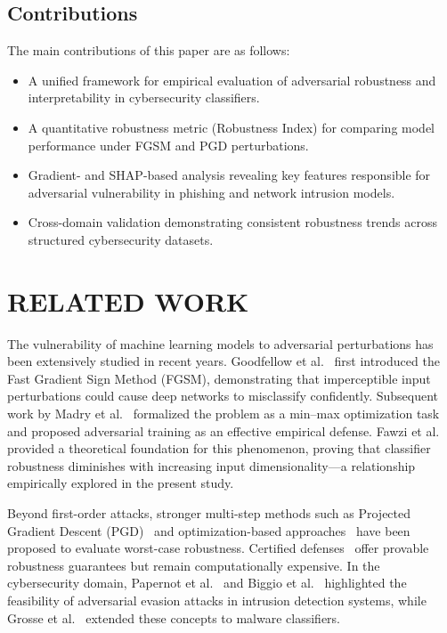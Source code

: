\documentclass[a4paper,twoside]{article}
\begin{document}
\subsection{Contributions}
The main contributions of this paper are as follows:
\begin{itemize}
    \item A unified framework for empirical evaluation of adversarial robustness 
          and interpretability in cybersecurity classifiers.
    \item A quantitative robustness metric (Robustness Index) 
          for comparing model performance under FGSM and PGD perturbations.
    \item Gradient- and SHAP-based analysis revealing key features 
          responsible for adversarial vulnerability in phishing and network intrusion models.
    \item Cross-domain validation demonstrating consistent robustness trends 
          across structured cybersecurity datasets.
\end{itemize}

\section{\uppercase{Related Work}}

The vulnerability of machine learning models to adversarial perturbations 
has been extensively studied in recent years. 
Goodfellow et al.~\cite{goodfellow2015explaining} first introduced 
the Fast Gradient Sign Method (FGSM), demonstrating that imperceptible 
input perturbations could cause deep networks to misclassify confidently. 
Subsequent work by Madry et al.~\cite{madry2018towards} formalized the problem 
as a min--max optimization task and proposed adversarial training 
as an effective empirical defense. 
Fawzi et al.~\cite{fawzi2018analysis} provided a theoretical foundation 
for this phenomenon, proving that classifier robustness diminishes 
with increasing input dimensionality---a relationship empirically explored 
in the present study.

Beyond first-order attacks, stronger multi-step methods such as 
Projected Gradient Descent (PGD)~\cite{madry2018towards} and 
optimization-based approaches~\cite{carlini2017towards} 
have been proposed to evaluate worst-case robustness. 
Certified defenses~\cite{cohen2019certified,zhang2019theoretically} 
offer provable robustness guarantees but remain computationally expensive. 
In the cybersecurity domain, 
Papernot et al.~\cite{papernot2016limitations} and 
Biggio et al.~\cite{biggio2013evasion} highlighted the feasibility 
of adversarial evasion attacks in intrusion detection systems, 
while Grosse et al.~\cite{grosse2017adversarial} extended these concepts 
to malware classifiers.
\end{document}
